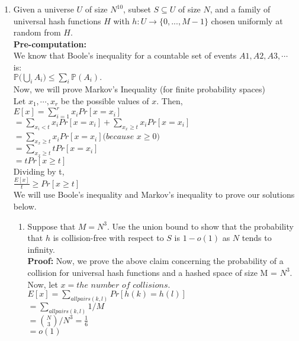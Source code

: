 \documentclass[12pt]{article}
\begin{document}
\begin{enumerate}
\begin{enumerate}
\end{enumerate}
\pagebreak
\item Given a universe $U$ of size $N^{10}$, subset $S \subseteq U$ of size $N$, and a family of universal hash functions $H$ with $h : U \rightarrow \{0, ..., M - 1\}$ chosen uniformly at random from $H$.\\
\textbf{Pre-computation:}\\
We know that Boole's inequality for a countable set of events $A1, A2, A3, \cdots$ is:\\
${\mathbb P}\biggl(\bigcup_{i} A_i\biggr) \le \sum_i {\mathbb P}(A_i).$\\
Now, we will prove Markov’s Inequality (for finite probability spaces)\\
Let ${x_{1}}, \cdots ,x{_{r}}$ be the possible values of $x$. Then, \\ 
$\displaystyle{E[x] = \sum_{i=1}^{r} x_{i}Pr[x=x_{i}]}$\\ 
$\displaystyle{	  = \sum_{x_{i}<t}x_{i}Pr[x=x_{i}] + \sum_{x_{x}\ge t}x_{i}Pr[x=x_{i}] }$ \\
$\displaystyle{		  = \sum_{x_{x}\ge t}x_{i}Pr[x=x_{i}] (because}$ $\displaystyle{	x \ge 0) }$ \\
$\displaystyle{	  = \sum_{x_{x}\ge t}tPr[x=x_{i}] }$ \\
$\displaystyle{    = t Pr[x \ge t] }$\\
Dividing by t,\\
$\displaystyle{ \frac{E[x]}{t} \ge Pr[x \ge t] }$ \\
We will use Boole's inequality and Markov's inequality to prove our solutions below.
\begin{enumerate}
\item Suppose that $M = N^3$. Use the union bound to show that the probability that $h$ is collision-free with respect to $S$ is $1 − o(1)$ as $N$ tends to infinity.\\
\textbf{Proof:}  
Now, we prove the above claim concerning the probability of a collision for universal hash functions and a hashed space of size M = $N^{3}$. \\
Now, let $x = the$ $number$ $of$ $collisions.$ \\
$\displaystyle{	 E[x] = \sum_{all pairs (k,l)} Pr[h(k) = h(l)] }$ \\
$\displaystyle{	      = \sum_{all pairs (k,l)} 1/M }$ \\
$\displaystyle{	      = {N \choose 3}/N^{3} = \frac{1}{6} }$ \\
$\displaystyle{	      = o(1) }$ \\

\end{enumerate}
\end{enumerate}
\end{document}
